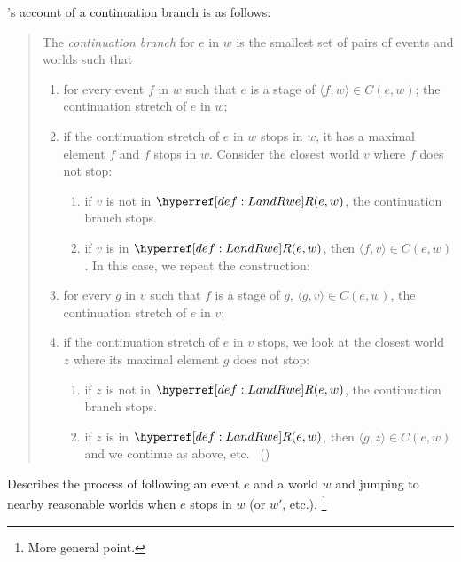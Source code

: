 \begin{note}
  \citeauthor{Landman:1992wh}'s account of a continuation branch is as follows:
  \begin{quote}
    The \emph{continuation branch} for \(e\) in \(w\) is the smallest set of pairs of events and worlds such that
    \begin{enumerate}
    \item
      \label{Landman:CB:continues}
      for every event \(f\) in \(w\) such that \(e\) is a stage of \(\langle f,w \rangle \in C(e,w)\);
      the continuation stretch of \(e\) in \(w\);
    \item
      \label{Landman:CB:stops}
      if the continuation stretch of \(e\) in \(w\) stops in \(w\), it has a maximal element \(f\) and \(f\) stops in \(w\).
      Consider the closest world \(v\) where \(f\) does not stop:
      \begin{enumerate}[label=--]
      \item
        if \(v\) is not in \(\lRwe{w}{e}\), the continuation branch stops.
      \item
        if \(v\) is in \(\lRwe{w}{e}\), then \(\langle f,v \rangle \in C(e,w)\).
        In this case, we repeat the construction:
      \end{enumerate}
    \item
      \label{Landman:CB:continues:again}
      for every \(g\) in \(v\) such that \(f\) is a stage of \(g\), \(\langle g,v \rangle \in C(e,w)\), the continuation stretch of \(e\) in \(v\);
    \item
      \label{Landman:CB:stops:again}
      if the continuation stretch of \(e\) in \(v\) stops, we look at the closest world \(z\) where its maximal element \(g\) does not stop:
      \begin{enumerate}[label=--]
      \item
        if \(z\) is not in \(\lRwe{w}{e}\), the continuation branch stops.
      \item
        if \(z\) is in \(\lRwe{w}{e}\), then \(\langle g,z \rangle \in C(e,w)\) and we continue as above, etc.%
        \mbox{ }\hfill\mbox{(\citeyear[26--27]{Landman:1992wh})}
      \end{enumerate}
    \end{enumerate}
  \end{quote}

  Describes the process of following an event \(e\) and a world \(w\) and jumping to nearby reasonable worlds when \(e\) stops in \(w\) (or \(w'\), etc.).%
  \footnote{
    More general point.

}
\end{note}
